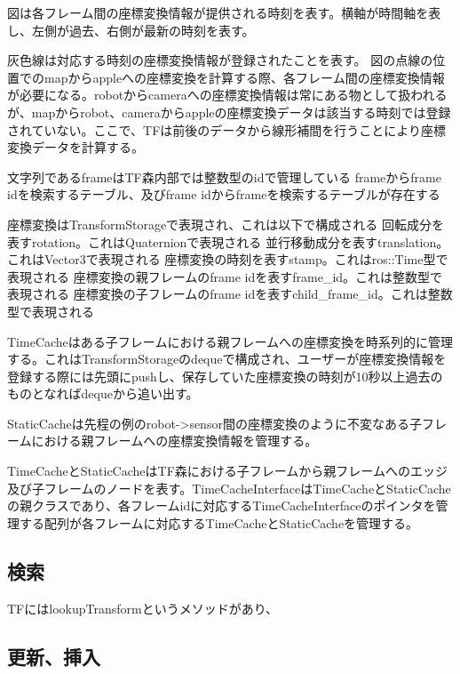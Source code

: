 \documentclass{article}
\begin{document}
\begin{multicols}{2}

図は各フレーム間の座標変換情報が提供される時刻を表す。横軸が時間軸を表し、左側が過去、右側が最新の時刻を表す。

灰色線は対応する時刻の座標変換情報が登録されたことを表す。
図の点線の位置でのmapからappleへの座標変換を計算する際、各フレーム間の座標変換情報が必要になる。robotからcameraへの座標変換情報は常にある物として扱われるが、mapからrobot、cameraからappleの座標変換データは該当する時刻では登録されていない。ここで、TFは前後のデータから線形補間を行うことにより座標変換データを計算する。




文字列であるframeはTF森内部では整数型のidで管理している
frameからframe idを検索するテーブル、及びframe idからframeを検索するテーブルが存在する

座標変換はTransformStorageで表現され、これは以下で構成される
回転成分を表すrotation。これはQuaternionで表現される
並行移動成分を表すtranslation。これはVector3で表現される
座標変換の時刻を表すstamp。これはros::Time型で表現される
座標変換の親フレームのframe idを表すframe\_id。これは整数型で表現される
座標変換の子フレームのframe idを表すchild\_frame\_id。これは整数型で表現される

TimeCacheはある子フレームにおける親フレームへの座標変換を時系列的に管理する。これはTransformStorageのdequeで構成され、ユーザーが座標変換情報を登録する際には先頭にpushし、保存していた座標変換の時刻が10秒以上過去のものとなればdequeから追い出す。

StaticCacheは先程の例のrobot->sensor間の座標変換のように不変なある子フレームにおける親フレームへの座標変換情報を管理する。

TimeCacheとStaticCacheはTF森における子フレームから親フレームへのエッジ及び子フレームのノードを表す。TimeCacheInterfaceはTimeCacheとStaticCacheの親クラスであり、各フレームidに対応するTimeCacheInterfaceのポインタを管理する配列が各フレームに対応するTimeCacheとStaticCacheを管理する。


\subsection{検索}

TFにはlookupTransformというメソッドがあり、


\subsection{更新、挿入}






\end{multicols}
\end{document}
